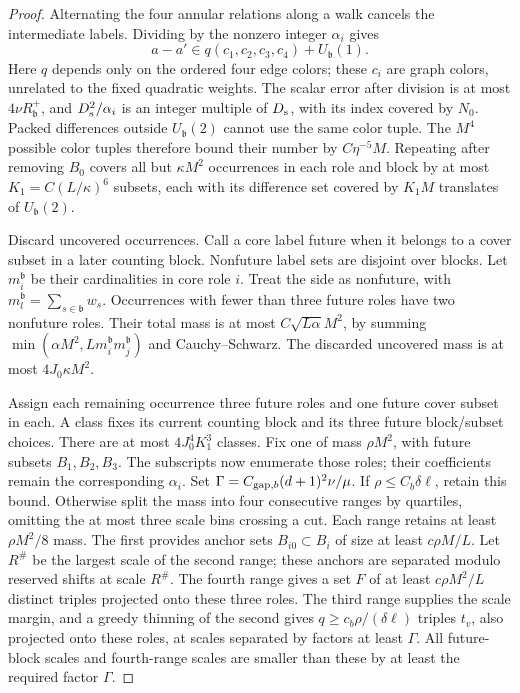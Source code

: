 \begin{proof}
Alternating the four annular relations along a walk cancels the
intermediate labels.  Dividing by the nonzero integer \(\alpha_i\)
gives
\[
 a-a'\in q(c_1,c_2,c_3,c_4)+U_{\mathfrak b}(1).
\]
Here \(q\) depends only on the ordered four edge colors; these
\(c_i\) are graph colors, unrelated to the fixed quadratic weights.
The scalar error after division is at most
\(4\nu R_{\mathfrak b}^+\), and
\(D_{\rm s}^2/\alpha_i\) is an integer multiple of
\(D_{\rm s}\), with its index covered by \(N_0\).
Packed differences outside \(U_{\mathfrak b}(2)\) cannot use the
same color tuple.  The \(M^4\) possible color tuples therefore
bound their number by \(C\eta^{-5}M\).  Repeating after removing
\(B_0\) covers all but \(\kappa M^2\) occurrences in each role
and block by at most
\(K_1=C(L/\kappa)^6\) subsets, each with its difference set
covered by \(K_1M\) translates of \(U_{\mathfrak b}(2)\).

Discard uncovered occurrences.  Call a core label future when it
belongs to a cover subset in a later counting block.  Nonfuture
label sets are disjoint over blocks.  Let \(m_i^{\mathfrak b}\)
be their cardinalities in core role \(i\).  Treat the side as
nonfuture, with \(m_l^{\mathfrak b}=\sum_{s\in\mathfrak b}w_s\).
Occurrences with fewer than three future roles have two nonfuture
roles.  Their total mass is at most \(C\sqrt{L\alpha}M^2\), by
summing
\(\min(\alpha M^2,Lm_i^{\mathfrak b}m_j^{\mathfrak b})\)
and Cauchy--Schwarz.  The discarded uncovered mass is at most
\(4J_0\kappa M^2\).

Assign each remaining occurrence three future roles and one future
cover subset in each.  A class fixes its current counting block
and its three future block/subset choices.  There are at most
\(4J_0^4K_1^3\) classes.  Fix one of mass \(\rho M^2\), with
future subsets \(B_1,B_2,B_3\).
The subscripts now enumerate those roles; their coefficients remain
the corresponding \(\alpha_i\).  Set
\(\Gamma=C_{{\rm gap},b}(d+1)^2\nu/\mu\).
If \(\rho\le C_b\delta\ell\), retain this bound.  Otherwise split
the mass into four consecutive ranges by quartiles, omitting the
at most three scale bins crossing a cut.  Each range retains at
least \(\rho M^2/8\) mass.  The first provides anchor sets
\(B_{i0}\subset B_i\) of size at least \(c\rho M/L\).
Let \(R^\#\) be the largest scale of the second range; these
anchors are separated modulo reserved shifts at scale \(R^\#\).
The fourth range gives a set \(F\) of at least \(c\rho M^2/L\)
distinct triples projected onto these three roles.
The third range supplies the scale margin, and a greedy thinning
of the second gives \(q\ge c_b\rho/(\delta\ell)\) triples
\(t_v\), also projected onto these roles, at scales separated by
factors at least \(\Gamma\).
All future-block scales and fourth-range scales are smaller than
these by at least the required factor \(\Gamma\).


\end{proof}
